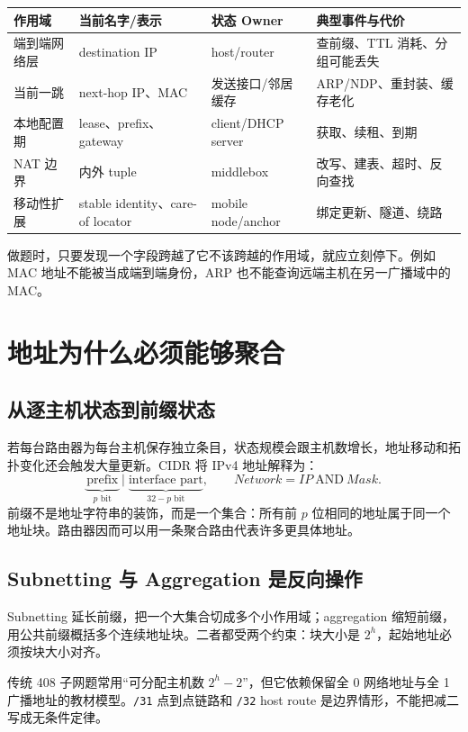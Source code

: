 \documentclass[11pt,a4paper]{ctexart}
\newcommand{\code}[1]{\texttt{#1}}
\begin{document}
\begin{center}
\small
\begin{tabularx}{\linewidth}{L{2.2cm}L{3.1cm}L{3.0cm}Y}
\toprule
作用域 & 当前名字/表示 & 状态 Owner & 典型事件与代价\\
\midrule
端到端网络层 & destination IP & host/router & 查前缀、TTL 消耗、分组可能丢失\\
当前一跳 & next-hop IP、MAC & 发送接口/邻居缓存 & ARP/NDP、重封装、缓存老化\\
本地配置期 & lease、prefix、gateway & client/DHCP server & 获取、续租、到期\\
NAT 边界 & 内外 tuple & middlebox & 改写、建表、超时、反向查找\\
移动性扩展 & stable identity、care-of locator & mobile node/anchor & 绑定更新、隧道、绕路\\
\bottomrule
\end{tabularx}
\end{center}

做题时，只要发现一个字段跨越了它不该跨越的作用域，就应立刻停下。例如 MAC 地址不能被当成端到端身份，ARP 也不能查询远端主机在另一广播域中的 MAC。

\section{地址为什么必须能够聚合}

\subsection{从逐主机状态到前缀状态}

若每台路由器为每台主机保存独立条目，状态规模会跟主机数增长，地址移动和拓扑变化还会触发大量更新。CIDR 将 IPv4 地址解释为：
\[
\underbrace{\text{prefix}}_{p\text{ bit}}
\mid
\underbrace{\text{interface part}}_{32-p\text{ bit}},
\qquad
Network=IP\ \mathrm{AND}\ Mask.
\]
前缀不是地址字符串的装饰，而是一个集合：所有前 $p$ 位相同的地址属于同一个地址块。路由器因而可以用一条聚合路由代表许多更具体地址。

\subsection{Subnetting 与 Aggregation 是反向操作}

Subnetting 延长前缀，把一个大集合切成多个小作用域；aggregation 缩短前缀，用公共前缀概括多个连续地址块。二者都受两个约束：块大小是 $2^h$，起始地址必须按块大小对齐。

传统 408 子网题常用“可分配主机数 $2^h-2$”，但它依赖保留全 0 网络地址与全 1 广播地址的教材模型。\code{/31} 点到点链路和 \code{/32} host route 是边界情形，不能把减二写成无条件定律。
\end{document}
